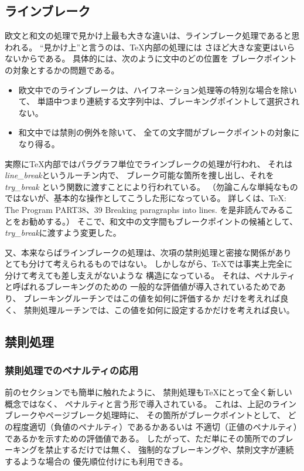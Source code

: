 \subsection{ラインブレーク}
欧文と和文の処理で見かけ上最も大きな違いは、ラインブレーク処理であると思われる。
``見かけ上''と言うのは、\TeX 内部の処理には
さほど大きな変更はいらないからである。
具体的には、次のように文中のどの位置を
ブレークポイントの対象とするかの問題である。
\begin{itemize}
\item 欧文中でのラインブレークは、ハイフネーション処理等の特別な場合を除いて、
単語中つまり連続する文字列中は、ブレーキングポイントして選択されない。
\item 和文中では禁則の例外を除いて、
全ての文字間がブレークポイントの対象になり得る。
\end{itemize}
実際に\TeX 内部ではパラグラフ単位でラインブレークの処理が行われ、
それは{\it line\_break}というルーチン内で、
ブレーク可能な箇所を捜し出し、それを{\it try\_break}
という関数に渡すことにより行われている。
（勿論こんな単純なものではないが、基本的な操作としてこうした形になっている。
詳しくは、\TeX: The Program PART38、39 Breaking paragraphs into lines.
を是非読んでみることをお勧めする。）
そこで、和文中の文字間もブレークポイントの候補として、
{\it try\_break}に渡すよう変更した。

又、本来ならばラインブレークの処理は、次項の禁則処理と密接な関係があり
とても分けて考えられるものではない。
しかしながら、\TeX では事実上完全に分けて考えても差し支えがないような
構造になっている。
それは、ペナルティと呼ばれるブレーキングのための
一般的な評価値が導入されているためであり、
ブレーキングルーチンではこの値を如何に評価するか
だけを考えれば良く、
禁則処理ルーチンでは、この値を如何に設定するかだけを考えれば良い。
%
\subsection{禁則処理}
%
\subsubsection{禁則処理でのペナルティの応用}
前のセクションでも簡単に触れたように、
禁則処理も\TeX にとって全く新しい概念ではなく、
ペナルティと言う形で導入されている。
これは、上記のラインブレークやページブレーク処理時に、
その箇所がブレークポイントとして、
どの程度適切（負値のペナルティ）であるかあるいは
不適切（正値のペナルティ）であるかを示すための評価値である。
したがって、ただ単にその箇所でのブレーキングを禁止するだけでは無く、
強制的なブレーキングや、禁則文字が連続するような場合の
優先順位付けにも利用できる。

